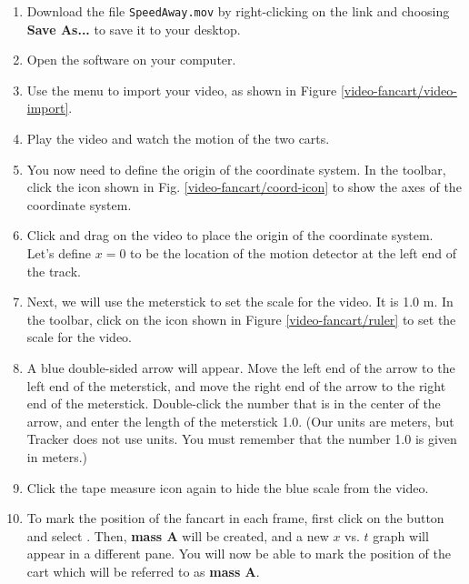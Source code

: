\begin{enumerate}
	\item Download the file \texttt{SpeedAway.mov} by right-clicking on the link and choosing {\bf Save As...} to save it to your desktop.
	\item Open the  software on your computer.
	\item Use the menu  to import your video, as shown in Figure \ref{video-fancart/video-import}.

	\item Play the video and watch the motion of the two carts. 
	

	\item You now need to define the origin of the coordinate system. In the toolbar, click the  icon shown in Fig. \ref{video-fancart/coord-icon} to show the axes of the coordinate system.
	

	\item Click and drag on the video to place the origin of the coordinate system. Let's define $x=0$ to be the location of the motion detector at the left end of the track.
				
	\item Next, we will use the meterstick to set the scale for the video. It is 1.0 m.  In the toolbar, click on the  icon shown in Figure \ref{video-fancart/ruler} to set the scale for the video.
		

	\item A blue double-sided arrow will appear. Move the left end of the arrow to the left end of the meterstick, and move the right end of the arrow to the right end of the meterstick. Double-click the number that is in the center of the arrow, and enter the length of the meterstick 1.0. (Our units are meters, but Tracker does not use units. You must remember that the number 1.0 is given in meters.)
	
	\item Click the tape measure icon again to hide the blue scale from the video.
	
	\item To mark the position of the fancart in each frame, first click on the  button and select . Then, {\bf mass A} will be created, and a new $x$ vs. $t$ graph will appear in a different pane. You will now be able to mark the position of the cart which will be referred to as {\bf mass A}.


\end{enumerate}
